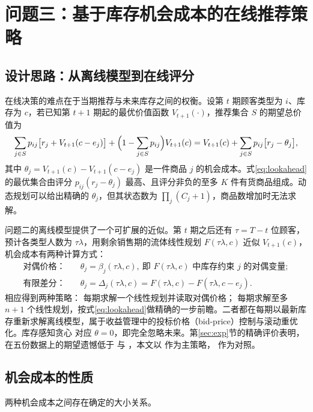 \section{问题三：基于库存机会成本的在线推荐策略}\label{sec:policy}

\subsection{设计思路：从离线模型到在线评分}
在线决策的难点在于当期推荐与未来库存之间的权衡。设第 $t$ 期顾客类型为 $i$、库存为 $c$，若已知第 $t+1$ 期起的最优价值函数 $V_{t+1}(\cdot)$，推荐集合 $S$ 的期望总价值为
\begin{equation}
\sum_{j\in S}p_{ij}\bigl[r_j+V_{t+1}(c-e_j)\bigr]+\Bigl(1-\sum_{j\in S}p_{ij}\Bigr)V_{t+1}(c)
=V_{t+1}(c)+\sum_{j\in S}p_{ij}\bigl[r_j-\theta_j\bigr],
\label{eq:lookahead}
\end{equation}
其中 $\theta_j=V_{t+1}(c)-V_{t+1}(c-e_j)$ 是一件商品 $j$ 的机会成本。式\eqref{eq:lookahead}的最优集合由评分 $p_{ij}(r_j-\theta_j)$ 最高、且评分非负的至多 $K$ 件有货商品组成。动态规划可以给出精确的 $\theta_j$，但其状态数为 $\prod_j(C_j+1)$，商品数增加时无法求解。

问题二的离线模型提供了一个可扩展的近似。第 $t$ 期之后还有 $\tau=T-t$ 位顾客，预计各类型人数为 $\tau\lambda$，用剩余销售期的流体线性规划 $F(\tau\lambda,c)$ 近似 $V_{t+1}(c)$，机会成本有两种计算方式：
\begin{align}
\text{对偶价格：}\quad &\theta_j=\beta_j(\tau\lambda,c),\ \text{即 }F(\tau\lambda,c)\text{ 中库存约束 }j\text{ 的对偶变量}; \label{eq:theta_dual}\\
\text{有限差分：}\quad &\theta_j=\Delta_j(\tau\lambda,c)=F(\tau\lambda,c)-F(\tau\lambda,c-e_j). \label{eq:theta_fd}
\end{align}
相应得到两种策略：\LPDual{} 每期求解一个线性规划并读取对偶价格；\LPFD{} 每期求解至多 $n+1$ 个线性规划，按式\eqref{eq:lookahead}做精确的一步前瞻。二者都在每期以最新库存重新求解离线模型，属于收益管理中的投标价格（bid-price）控制与滚动重优化\cite{talluri98,jasin,bumpensanti}。库存感知贪心 \Greedy{} 对应 $\theta=0$，即完全忽略未来。第\ref{sec:exp}节的精确评价表明，\LPDual{} 在五份数据上的期望遗憾低于 \LPFD{} 与 \Greedy{}，本文以 \LPDual{} 作为主策略，\LPFD{} 作为对照。

\subsection{机会成本的性质}
两种机会成本之间存在确定的大小关系。


